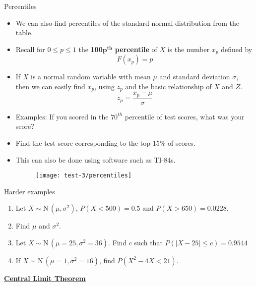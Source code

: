 \documentclass{article}
\newcommand{\bu}[1]{\textbf{\ul{#1}}}				%
\newcommand{\follow}[1]{\sim \text{#1}\,}		%
\begin{document}
Percentiles\bigskip
\begin{itemize}
    \item We can also find percentiles of the standard normal distribution from the table.
    \item Recall for $0 \le p \le 1$ the \textbf{100}$\boldsymbol{p^{th}}$ \textbf{percentile} of $X$ is the number $x_p$ defined by
    \[F(x_p) = p\]
    \item If $X$ is a normal random variable with mean $\mu$ and standard deviation $\sigma$, then we can easily find $x_p$, using $z_p$ and the basic relationship of $X$ and $Z$.
    \[z_p = \frac{x_p - \mu}{\sigma}\]
    \item Examples: If you scored in the $70^{th}$ percentile of test scores, what was your score?\vspace{140pt}
    \item[] Find the test score corresponding to the top 15\% of scores.\vspace{100pt}
    \item This can also be done using software such as TI-84s.
    \begin{figure}[H]
        \center\texttt{[image: test-3/percentiles]}
    \end{figure}
\end{itemize}\bigskip

Harder examples\bigskip
\begin{enumerate}
    \item Let $X \follow{N}(\mu, \sigma^2)$, $P(X < 500) = 0.5$ and $P(X > 650) = 0.0228$.
    \item[] Find $\mu$ and $\sigma^2$.\vspace{130pt}
    \item Let $X \follow{N}(\mu = 25, \sigma^2 = 36)$. Find $c$ such that $P(\lvert X - 25 \rvert \le c) = 0.9544$\vspace{130pt}
    \item If $X \follow{N}(\mu = 1, \sigma^2 = 16)$, find $P(X^2 - 4X < 21)$.\vspace{130pt}
\end{enumerate}\bigskip

\bu{Central Limit Theorem}\bigskip
\end{document}
